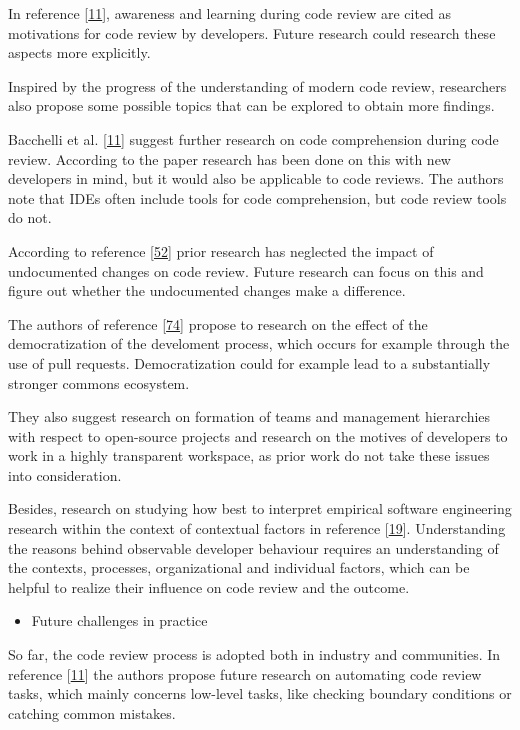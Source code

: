 \documentclass[]{book}
\providecommand{\tightlist}{%
  \setlength{\itemsep}{0pt}\setlength{\parskip}{0pt}}
\begin{document}
In reference
{[}\protect\hyperlink{ref-bacchelli2013expectations}{11}{]}, awareness
and learning during code review are cited as motivations for code review
by developers. Future research could research these aspects more
explicitly.

Inspired by the progress of the understanding of modern code review,
researchers also propose some possible topics that can be explored to
obtain more findings.

Bacchelli et al.
{[}\protect\hyperlink{ref-bacchelli2013expectations}{11}{]} suggest
further research on code comprehension during code review. According to
the paper research has been done on this with new developers in mind,
but it would also be applicable to code reviews. The authors note that
IDEs often include tools for code comprehension, but code review tools
do not.

According to reference
{[}\protect\hyperlink{ref-czerwonka2015code}{52}{]} prior research has
neglected the impact of undocumented changes on code review. Future
research can focus on this and figure out whether the undocumented
changes make a difference.

The authors of reference
{[}\protect\hyperlink{ref-gousios2014exploratory}{74}{]} propose to
research on the effect of the democratization of the develoment process,
which occurs for example through the use of pull requests.
Democratization could for example lead to a substantially stronger
commons ecosystem.

They also suggest research on formation of teams and management
hierarchies with respect to open-source projects and research on the
motives of developers to work in a highly transparent workspace, as
prior work do not take these issues into consideration.

Besides, research on studying how best to interpret empirical software
engineering research within the context of contextual factors in
reference {[}\protect\hyperlink{ref-baysal2013influence}{19}{]}.
Understanding the reasons behind observable developer behaviour requires
an understanding of the contexts, processes, organizational and
individual factors, which can be helpful to realize their influence on
code review and the outcome.

\begin{itemize}
\tightlist
\item
  Future challenges in practice
\end{itemize}

So far, the code review process is adopted both in industry and
communities. In reference
{[}\protect\hyperlink{ref-bacchelli2013expectations}{11}{]} the authors
propose future research on automating code review tasks, which mainly
concerns low-level tasks, like checking boundary conditions or catching
common mistakes.
\end{document}
